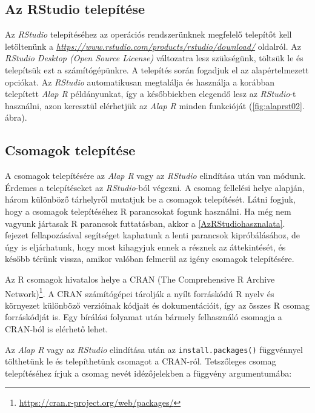 \documentclass[
]{book}
\DeclareRobustCommand{\href}[2]{#2\footnote{\url{#1}}}
\renewcommand{\href}[2]{#2\footnote{\url{#1}}}
\begin{document}
\hypertarget{az-rstudio-telepitese}{%
\subsection{Az RStudio telepítése}\label{az-rstudio-telepitese}}

Az \emph{RStudio} telepítéséhez az operációs rendszerünknek megfelelő telepítőt kell letöltenünk a \emph{\url{https://www.rstudio.com/products/rstudio/download/}} oldalról. Az \emph{RStudio Desktop (Open Source License)} változatra lesz szükségünk, töltsük le és telepítsük ezt a számítógépünkre. A telepítés során fogadjuk el az alapértelmezett opciókat. Az \emph{RStudio} automatikusan megtalálja és használja a korábban telepített \emph{Alap R} példányunkat, így a későbbiekben elegendő lesz az \emph{RStudio}-t használni, azon keresztül elérhetjük az \emph{Alap R} minden funkcióját (\ref{fig:alaprst02}. ábra).

\hypertarget{Csomagoktelepitese}{%
\subsection{Csomagok telepítése}\label{Csomagoktelepitese}}

A csomagok telepítésére az \emph{Alap R} vagy az \emph{RStudio} elindítása után van módunk. Érdemes a telepítéseket az \emph{RStudio}-ból végezni. A csomag fellelési helye alapján, három különböző tárhelyről mutatjuk be a csomagok telepítését. Látni fogjuk, hogy a csomagok telepítéséhez R parancsokat fogunk használni. Ha még nem vagyunk jártasak R parancsok futtatásban, akkor a \ref{AzRStudiohasznalata}. fejezet fellapozásával segítséget kaphatunk a lenti parancsok kipróbálásához, de úgy is eljárhatunk, hogy most kihagyjuk ennek a résznek az áttekintését, és később térünk vissza, amikor valóban felmerül az igény csomagok telepítésére.

Az R csomagok hivatalos helye a \href{https://cran.r-project.org/web/packages/}{CRAN (The Comprehensive R Archive Network)}. A CRAN számítógépei tárolják a nyílt forráskódú R nyelv és környezet különböző verzióinak kódjait és dokumentációit, így az összes R csomag forráskódját is. Egy bírálási folyamat után bármely felhasználó csomagja a CRAN-ból is elérhető lehet.

Az \emph{Alap R} vagy az \emph{RStudio} elindítása után az \texttt{install.packages()} függvénnyel tölthetünk le és telepíthetünk csomagot a CRAN-ról. Tetszőleges csomag telepítéséhez írjuk a csomag nevét idézőjelekben a függvény argumentumába:
\end{document}
